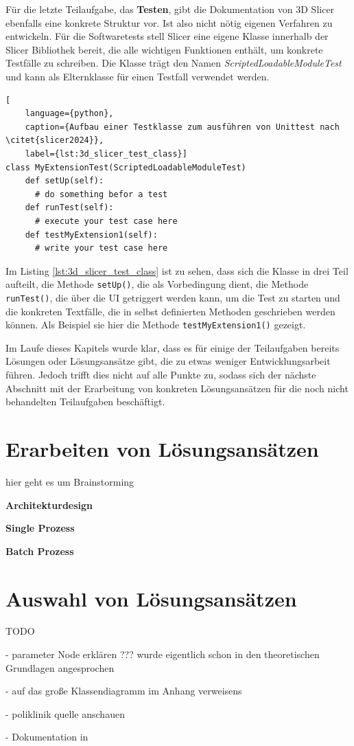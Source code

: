 Für die letzte Teilaufgabe, das \textbf{Testen}, gibt die Dokumentation von 3D Slicer
ebenfalls eine konkrete Struktur vor. Ist also nicht nötig eigenen Verfahren zu
entwickeln. Für die Softwaretests stell Slicer eine eigene Klasse innerhalb der Slicer
Bibliothek bereit, die alle wichtigen Funktionen enthält, um konkrete Testfälle zu
schreiben. Die Klasse trägt den Namen \textsl{ScriptedLoadableModuleTest} und kann
als Elternklasse für einen Testfall verwendet werden.

\begin{lstlisting}[
    language={python},
    caption={Aufbau einer Testklasse zum ausführen von Unittest nach \citet{slicer2024}},
    label={lst:3d_slicer_test_class}]
class MyExtensionTest(ScriptedLoadableModuleTest)
    def setUp(self):
      # do something befor a test
    def runTest(self):
      # execute your test case here
    def testMyExtension1(self):
      # write your test case here
\end{lstlisting}

Im Listing \ref{lst:3d_slicer_test_class} ist zu sehen, dass sich die Klasse in drei
Teil aufteilt, die Methode \texttt{setUp()}, die als Vorbedingung dient, die Methode
\texttt{runTest()}, die über die UI getriggert werden kann, um die Test zu
starten und die konkreten Textfälle, die in selbst definierten Methoden geschrieben
werden können. Als Beispiel sie hier die Methode \texttt{testMyExtension1()} gezeigt.

Im Laufe dieses Kapitels wurde klar, dass es für einige der Teilaufgaben bereits
Lösungen oder Lösungsansätze gibt, die zu etwas weniger Entwicklungsarbeit führen.
Jedoch trifft dies nicht auf alle Punkte zu, sodass sich der nächste Abschnitt mit
der Erarbeitung von konkreten Lösungsansätzen für die noch nicht behandelten Teilaufgaben
beschäftigt.

\section{Erarbeiten von Lösungsansätzen}
\label{sec:lösungsansätze} hier geht es um Brainstorming

\textbf{Architekturdesign}

\textbf{Single Prozess}

\textbf{Batch Prozess}


\section{Auswahl von Lösungsansätzen}

TODO

- parameter Node erklären ??? wurde eigentlich schon in den theoretischen Grundlagen
angesprochen

- auf das große Klassendiagramm im Anhang verweisens

- poliklinik quelle anschauen

- Dokumentation in
